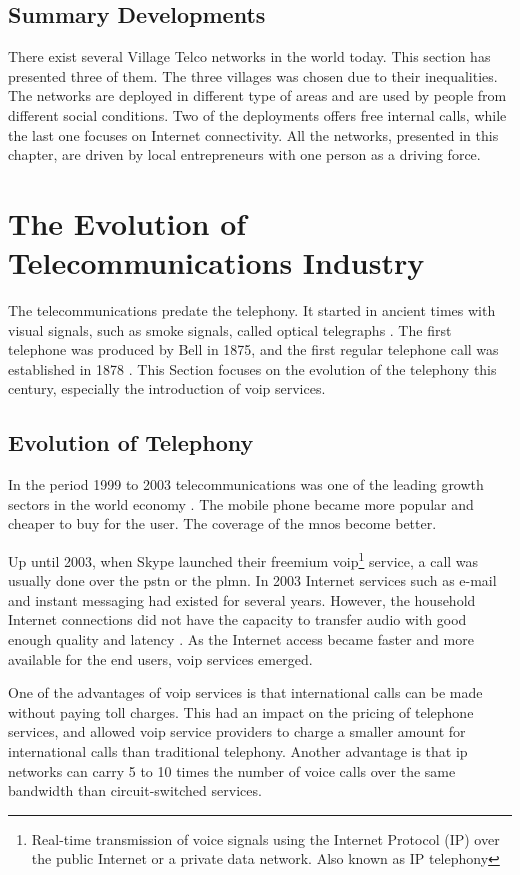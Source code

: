 \subsection{Summary Developments}
There exist several Village Telco networks in the world today. This section has presented three of them. The three villages was chosen due to their inequalities. The networks are deployed in different type of areas and are used by people from different social conditions. Two of the deployments offers free internal calls, while the last one focuses on Internet connectivity. All the networks, presented in this chapter, are driven by local entrepreneurs with one person as a driving force.

\section{The Evolution of Telecommunications Industry}
The telecommunications predate the telephony. It started in ancient times with visual signals, such as smoke signals, called optical telegraphs \cite{itu50years}. The first telephone was produced by Bell in 1875, and the first regular telephone call was established in 1878 \cite{hallock2004brief}. This Section focuses on the evolution of the telephony this century, especially the introduction of \gls{voip} services. 


\subsection{Evolution of Telephony}
In the period 1999 to 2003 telecommunications was one of the leading growth sectors in the world economy \cite{itu50years}. The mobile phone became more popular and cheaper to buy for the user. The coverage of the \glspl{mno} become better.

Up until 2003, when Skype launched their freemium \gls{voip}\footnote{Real-time transmission of voice signals using 
the Internet Protocol (IP) over the public Internet or a private data network. Also known as IP telephony} service, a call was usually done over the \gls{pstn} or the \gls{plmn}. In 2003 Internet services such as e-mail and instant messaging had existed for several years. However, the household Internet connections did not have the capacity to transfer audio with good enough quality and latency \cite{thomasbruun}. As the Internet access became faster and more available for the end users, \gls{voip} services emerged. 

One of the advantages of \gls{voip} services is that international calls can be made without paying toll charges. This had an impact on the pricing of telephone services, and allowed \gls{voip} service providers to charge a smaller amount for international calls than traditional telephony. Another advantage is that \gls{ip} networks can carry 5 to 10 times the number of voice calls over the same bandwidth than circuit-switched services. 

